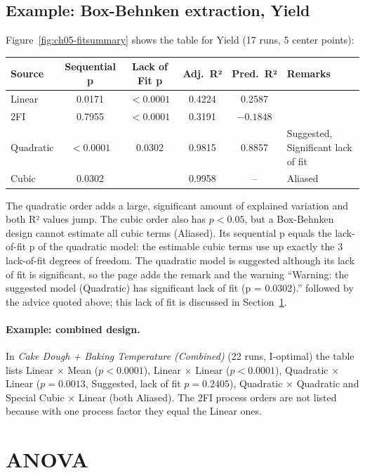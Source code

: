 \subsection*{Example: Box-Behnken extraction, Yield}
Figure~\ref{fig:ch05-fitsummary} shows the table for Yield (17 runs, 5 center points):

\begin{center}\small
\begin{tabular}{@{}lccccl@{}}
\toprule
Source & Sequential p & Lack of Fit p & Adj.\ R² & Pred.\ R² & Remarks \\
\midrule
Linear & 0.0171 & $<0.0001$ & 0.4224 & 0.2587 & \\
2FI & 0.7955 & $<0.0001$ & 0.3191 & $-0.1848$ & \\
Quadratic & $<0.0001$ & 0.0302 & 0.9815 & 0.8857 & Suggested, Significant lack of fit \\
Cubic & 0.0302 & & 0.9958 & -- & Aliased \\
\bottomrule
\end{tabular}
\end{center}

The quadratic order adds a large, significant amount of explained variation and both R² values jump. The
cubic order also has $p<0.05$, but a Box-Behnken design cannot estimate all cubic terms (Aliased). Its
sequential p equals the lack-of-fit p of the quadratic model: the estimable cubic terms use up exactly the
3 lack-of-fit degrees of freedom. The quadratic model is suggested although its lack of fit is significant,
so the page adds the remark  and the warning ``Warning: the suggested model (Quadratic)
has significant lack of fit (p = 0.0302).'' followed by the advice quoted above; this lack of fit is discussed in
Section~\ref{sec:ch05-anova}.

\paragraph{Example: combined design.} In \emph{Cake Dough + Baking Temperature (Combined)} (22 runs,
I-optimal) the table lists Linear $\times$ Mean ($p<0.0001$), Linear $\times$ Linear ($p<0.0001$),
Quadratic $\times$ Linear ($p=0.0013$, Suggested, lack of fit $p=0.2405$), Quadratic $\times$ Quadratic and
Special Cubic $\times$ Linear (both Aliased). The 2FI process orders are not listed because with one process
factor they equal the Linear ones.

\section{ANOVA}\label{sec:ch05-anova}

